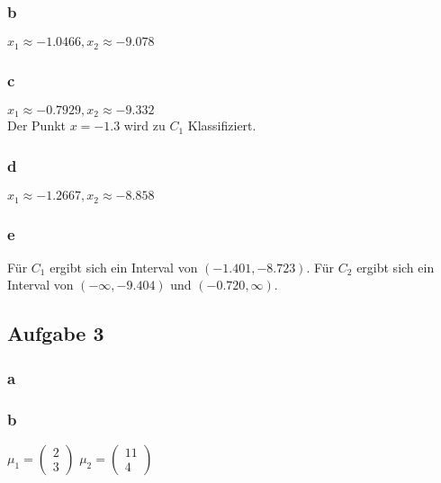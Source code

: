 \documentclass{article}
\begin{document}
	\subsubsection{b}
	$x_1 \approx -1.0466 , x_2 \approx -9.078$
	
	\subsubsection{c}
	$x_1 \approx -0.7929 , x_2 \approx -9.332$
	\\ Der Punkt $x=-1.3$ wird zu $C_1$ Klassifiziert.
	\subsubsection{d}
	$x_1 \approx -1.2667 , x_2 \approx -8.858$
	
	\subsubsection{e}
	Für $C_1$ ergibt sich ein Interval von $(-1.401 , -8.723)$.
	Für $C_2$ ergibt sich ein Interval von $(-\infty, -9.404) $ und $(-0.720, \infty)$.
	
\subsection{Aufgabe 3}
	\subsubsection{a}

		\begin{figure}[h]
		\end{figure}
		
		\subsubsection{b}
		
		$\mu_{1} = 
		\begin{pmatrix}
			2\\
			3	
		\end{pmatrix}$
		$\mu_{2} = 
		\begin{pmatrix}
			11\\
			4
		\end{pmatrix}$
		\\
				 
		 
\end{document}
